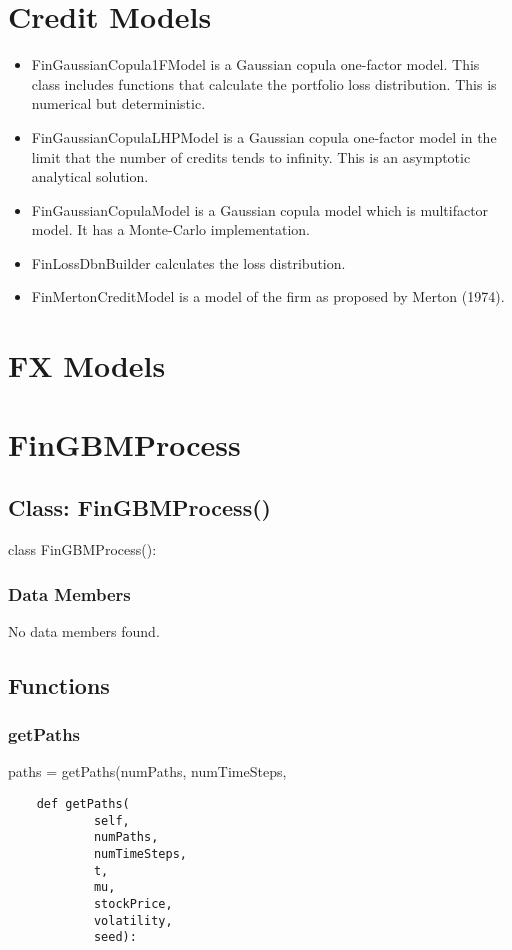 \documentclass[twoside,11pt]{book}
\begin{document}
\section*{Credit Models}
\begin{itemize}
\item{ FinGaussianCopula1FModel is a Gaussian copula one-factor model. This class includes functions that calculate the portfolio loss distribution. This is numerical but deterministic.
}
\item{ FinGaussianCopulaLHPModel is a Gaussian copula one-factor model in the limit that the number of credits tends to infinity. This is an asymptotic analytical solution.
}
\item{ FinGaussianCopulaModel is a Gaussian copula model which is multifactor model. It has a Monte-Carlo implementation.
}
\item{ FinLossDbnBuilder calculates the loss distribution.
}
\item{ FinMertonCreditModel is a model of the firm as proposed by Merton (1974).
}
\end{itemize}


\section*{FX Models}
\newpage
\section{FinGBMProcess}

\subsection*{Class: FinGBMProcess()}
class FinGBMProcess(): 

\subsubsection*{Data Members}
No data members found.

\subsection*{Functions}

\subsubsection*{{\bf getPaths}}
paths = getPaths(numPaths, numTimeSteps, 

\begin{lstlisting}
    def getPaths(
            self,
            numPaths,
            numTimeSteps,
            t,
            mu,
            stockPrice,
            volatility,
            seed):
\end{lstlisting}
\end{document}
